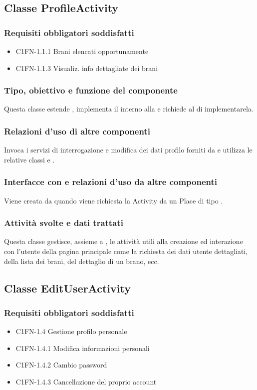 \subsection{Classe ProfileActivity}
\subsubsection*{Requisiti obbligatori soddisfatti}
\begin{itemize}
	\item C1FN-1.1.1 Brani elencati opportunamente
	\item C1FN-1.1.3 Visualiz. info dettagliate dei brani
\end{itemize}
\subsubsection*{Tipo, obiettivo e funzione del componente}
Questa classe estende , implementa il 
interno alla  e richiede al  di
implementarela.
\subsubsection*{Relazioni d'uso di altre componenti}
Invoca i servizi di interrogazione e modifica dei dati profilo forniti da
 e utilizza le relative classi  e
.
\subsubsection*{Interfacce con e relazioni d'uso da altre componenti}
Viene creata da  quando viene richiesta la Activity da
un Place di tipo .
\subsubsection*{Attivit\`a svolte e dati trattati}
Questa classe gestisce, assieme a , le attivit\`a utili alla
creazione ed interazione con l'utente della pagina principale come la
richiesta dei dati utente dettagliati, della lista dei brani, del dettaglio di
un brano, ecc.


\subsection{Classe EditUserActivity}
\subsubsection*{Requisiti obbligatori soddisfatti}
\begin{itemize}
	\item C1FN-1.4 Gestione profilo personale
	\item C1FN-1.4.1 Modifica informazioni personali
	\item C1FN-1.4.2 Cambio password
	\item C1FN-1.4.3 Cancellazione del proprio account
\end{itemize}
